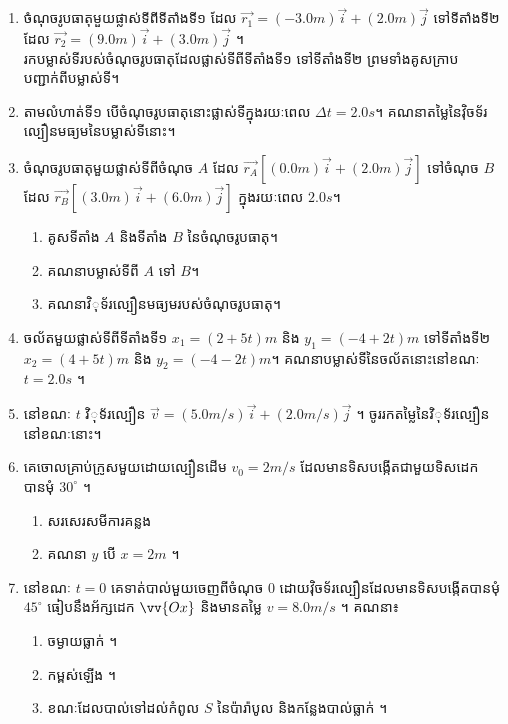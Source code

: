 \documentclass{officialexam}
\begin{document}
	\begin{enumerate}[m]
		\item ចំណុចរូបធាតុមួយផ្លាស់ទីពីទីតាំងទី១ ដែល $\vec{r_1} = \left(-3.0m\right)\vec{i}+\left(2.0m\right)\vec{j}$ ទៅទីតាំងទី២ ដែល $\vec{r_2}=\left(9.0m\right)\vec{i}+\left(3.0m\right)\vec{j}$ ។\\
		រកបម្លាស់ទីរបស់ចំណុចរូបធាតុដែលផ្លាស់ទីពីទីតាំងទី១ ទៅទីតាំងទី២ ព្រមទាំងគូសក្រាបបញ្ជាក់ពីបម្លាស់ទី។
		\item តាមលំហាត់ទី១ បើចំណុចរូបធាតុនោះផ្លាស់ទីក្នុងរយៈពេល $\Delta t=2.0s$។ គណនាតម្លៃនៃវុិចទ័រល្បឿនមធ្យមនៃបម្លាស់ទីនោះ។
		\item ចំណុចរូបធាតុមួយផ្លាស់ទីពីចំណុច $A$ ដែល $\vec{r_A}\left[\left(0.0m\right)\vec{i}+\left(2.0m\right)\vec{j}\right]$ ទៅចំណុច $B$ ដែល $\vec{r_B}\left[\left(3.0m\right)\vec{i}+\left(6.0m\right)\vec{j}\right]$ ក្នុងរយៈពេល $2.0s$។
		\begin{enumerate}[k]
			\item គូសទីតាំង $A$ និងទីតាំង $B$ នៃចំណុចរូបធាតុ។
			\item គណនាបម្លាស់ទីពី $A$ ទៅ $B$។
			\item គណនាវិុទ័រល្បឿនមធ្យមរបស់ចំណុចរូបធាតុ។
		\end{enumerate}
		\item ចល័តមួយផ្លាស់ទីពីទីតាំងទី១ $x_1=\left(2+5t\right)m$ និង $y_1=\left(-4+2t\right)m$ ទៅទីតាំងទី២ $x_2=\left(4+5t\right)m$ និង $y_2=\left(-4-2t\right)m$។ គណនាបម្លាស់ទីនៃចល័តនោះនៅខណៈ $t=2.0s$ ។
		\item នៅខណៈ $t$ វិុទ័រល្បឿន $\vec{v}=\left(5.0m/s\right)\vec{i}+\left(2.0m/s\right)\vec{j}$ ។ ចូររកតម្លៃនៃវិុទ័រល្បឿននៅខណៈនោះ។
		\item គេចោលគ្រាប់ក្រូសមួយដោយល្បឿនដើម $v_0=2m/s$ ដែលមានទិសបង្កើតជាមួយទិសដេកបានមុំ $30^\circ$ ។
		\begin{enumerate}[k]
			\item សរសេរសមីការគន្លង
			\item គណនា $y$ បើ $x=2m$ ។
		\end{enumerate}
		\item នៅខណៈ $t=0$ គេទាត់បាល់មួយចេញពីចំណុច $0$ ដោយវុិចទ័រល្បឿនដែលមានទិសបង្កើតបានមុំ $45^\circ$ ធៀបនឹងអ័ក្សដេក $\vv{Ox}$ និងមានតម្លៃ $v=8.0m/s$ ។ គណនា៖
		\begin{enumerate}[k]
			\item ចម្ងាយធ្លាក់ ។
			\item កម្ពស់ឡើង​ ។
			\item ខណៈដែលបាល់ទៅដល់កំពូល $S$ នៃប៉ារ៉ាបូល និងកន្លែងបាល់ធ្លាក់ ។
		\end{enumerate}
		\begin{multicols}{2}

\end{multicols}
\end{enumerate}
\end{document}
